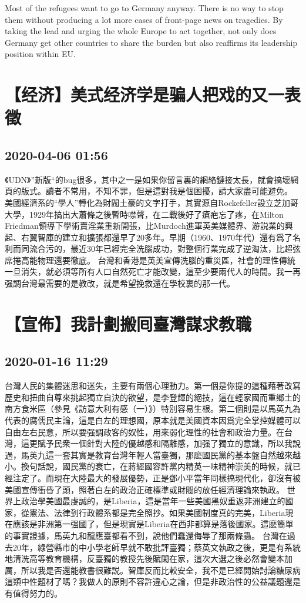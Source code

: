 \documentclass[twocolumn]{ctexart}
\begin{document}
Most of the refugees want to go to Germany anyway. There is no way to stop them without producing a lot more cases of front-page news on tragedies. By taking the lead and urging the whole Europe to act together, not only does Germany get other countries to share the burden but also reaffirms its leadership position within EU.\section*{【经济】美式经济学是骗人把戏的又一表徵}
\subsection*{2020-04-06 01:56}

《UDN》”新版“的bug很多，其中之一是如果你留言裏的網絡鏈接太長，就會搞壞網頁的版式。讀者不常用，不知不罪，但是這對我是個困擾，請大家盡可能避免。 
美國經濟系的“學人”轉化為財閥土豪的文字打手，其實源自Rockefeller設立芝加哥大學，1929年搞出大蕭條之後暫時噤聲，在二戰後好了瘡疤忘了疼，在Milton Friedman領導下學術賣淫業重新開張，比Murdoch進軍英美媒體界、游説業的興起、右翼智庫的建立和擴張都還早了20多年。早期（1960、1970年代）還有爲了名利而同流合污的，最近30年已經完全洗腦成功，對整個行業完成了逆淘汰，比超弦席捲高能物理還要徹底。 
台灣和香港是英美宣傳洗腦的重災區，社會的理性傳統一旦消失，就必須等所有人口自然死亡才能改變，這至少要兩代人的時間。我一再强調台灣最需要的是教改，就是希望挽救還在學校裏的那一代。
\section*{【宣佈】我計劃搬囘臺灣謀求教職}
\subsection*{2020-01-16 11:29}

台灣人民的集體迷思和迷失，主要有兩個心理動力。第一個是你提的這種藉著改寫歷史和扭曲自尊來挑起獨立自決的欲望，是李登輝的絕技，這在輕家國而重鄉土的南方食米區（參見《訪意大利有感（一）》）特別容易生根。第二個則是以馬英九為代表的腐儒民主論，這是白左的理想國，原本就是美國資本因爲完全掌控媒體可以自由左右民意，所以要强調政客的奴性，用來弱化理性的社會和政治力量。在台灣，這更賦予民衆一個針對大陸的優越感和隔離感，加强了獨立的意識，所以我說過，馬英九這一套其實是教育台灣年輕人當臺獨，那麽國民黨的基本盤自然越來越小。換句話說，國民黨的衰亡，在蔣經國容許黨内精英一味精神崇美的時候，就已經注定了。而現在大陸最大的發展優勢，正是鄧小平當年同樣搞現代化，卻沒有被美國宣傳衝昏了頭，照著白左的政治正確標準或財閥的放任經濟理論來執政。 
世界上政治學美國最虔誠的，是Liberia，這是當年一些美國黑奴重返非洲建立的國家，從憲法、法律到行政體系都是完全照抄。如果美國制度真的完美，Liberia現在應該是非洲第一强國了，但是現實是Liberia在西非都算是落後國家。這麽簡單的事實證據，馬英九和龍應臺都看不到，說他們蠢還侮辱了那兩條蟲。 
台灣在過去20年，綠營縣市的中小學老師早就不敢批評臺獨；蔡英文執政之後，更是有系統地清洗高等教育機構，反臺獨的教授先後賦閑在家，這次大選之後必然會變本加厲，所以我是否還能教書很難説。智庫反而比較安全，我不是已經開始討論糖尿病這類中性題材了嗎？我做人的原則不容許違心之論，但是非政治性的公益議題還是有值得努力的。
\end{document}
